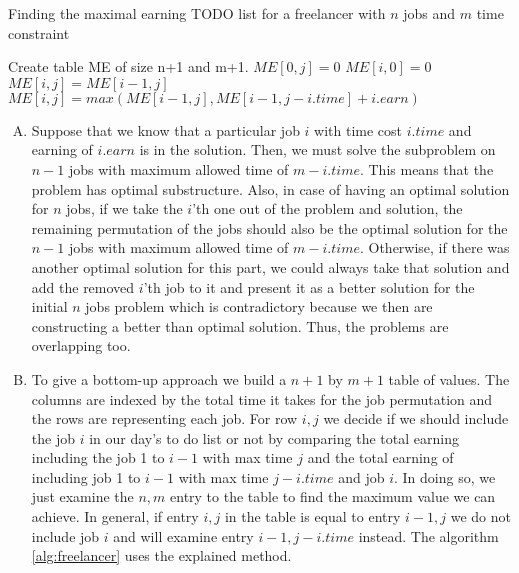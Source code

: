 \begin{algorithm}
	\caption{Finding the maximal earning TODO list for a freelancer with $n$ jobs and $m$ time constraint}\label{alg:freelancer}
	\begin{algorithmic}[1]
		\State Create table ME of size n+1 and m+1.
		\State $ME[0,j] = 0$
		\EndFor
		\State $ME[i,0] = 0$
		\EndFor
		\State $ME[i,j] = ME[i-1,j]$
		\EndIf
		\State $ME[i,j] = max(ME[i-1,j],ME[i-1,j-i.time] + i.earn)$
		\EndFor
		\EndFor
	\end{algorithmic}
\end{algorithm}
\begin{enumerate}[A.]
	\item Suppose that we know that a particular job $i$ with time cost $i.time$ and earning of $i.earn$ is in the solution. Then, we must solve the subproblem on $n-1$ jobs with maximum allowed time of $m - i.time$. This means that the problem has optimal substructure. Also, in case of having an optimal solution for $n$ jobs, if we take the $i$'th one out of the problem and solution, the remaining permutation of the jobs should also be the optimal solution for the $n-1$ jobs with maximum allowed time of $m - i.time$. Otherwise, if there was another optimal solution for this part, we could always take that solution and add the removed $i$'th job to it and present it as a better solution for the initial $n$ jobs problem which is contradictory because we then are constructing a better than optimal solution. Thus, the problems are overlapping too.
	\item 
	To give a bottom-up approach we build a $n+1$ by $m+1$ table of values. The columns are indexed by the total time it takes for the job permutation and the rows are representing each job. For row $i,j$ we decide if we should include the job $i$ in our day's to do list or not by comparing the total earning including the job 1 to $i-1$ with max time $j$ and the total earning of including job 1 to $i-1$ with max time $j-i.time$ and job $i$. In doing so, we just examine the $n,m$ entry to the table to find the maximum value we can achieve. In general, if entry $i,j$ in the table is equal to entry $i-1,j$ we do not include job $i$ and will examine entry $i-1,j-i.time$ instead. The algorithm \ref{alg:freelancer} uses the explained method.
	
\end{enumerate}

